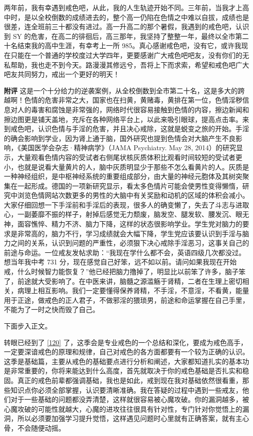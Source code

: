 \begin{case}
    两年前，我有幸遇到戒色吧，从此，我的人生轨迹开始不同。三年前，当我才上高中时，是以全校倒数的成绩进去的，整个高一仍陷在色情之中难以自拔，成绩也是很差，连全班前三十都没有进过。高一升高二的那个暑假，我遇到的戒色吧，认识到 SY 的危害，在高二的徘徊后，高三那年，我坚持了整整一年，最终以全市第二十名结束我的高中生涯，有幸考上一所 985。真心感谢戒色吧，没有它，或许我现在只能在一个普通的学校度过大学四年，更要感谢广大戒色吧吧友，没有你们的无私帮助，我也走不到今天。路漫漫其修远兮，吾将上下而求索，希望和戒色吧广大吧友共同努力，戒出一个更好的明天！

    \textbf{附评} 这是一个十分给力的逆袭案例，从全校倒数到全市第二十名，这是多大的跨越啊！色情的危害非常之大，国家也在扫黄，黄赌毒，黄排在第一位，色情淫秽信息对人的毒害和腐蚀是非常强的，网络时代很容易接触到色情的内容，擦边新闻和擦边图更是铺天盖地，充斥在各种网络平台上，以此来吸引眼球，提高点击率。来到戒色吧，认识色情与手淫的危害，并且决心戒除，这就是蜕变之旅的开始。手淫的确会影响到学业，因为肾上通于脑，国外研究也提到色情会对大脑产生不良影响，《美国医学会杂志·精神病学》（JAMA Psychiatry. May 28, 2014）的研究显示，大量观看色情内容的受试者右侧尾状核灰质体积比观看时间较短的受试者更小，也就是说看大量黄片的人，脑中灰质明显少于那些不怎么看黄片的人。灰质是一种神经组织，是中枢神经系统的重要组成部分，由大量的神经元胞体及其树突聚集在一起形成。德国的一项新研究显示，看太多色情片可能会使男性变得懒惰，研究中浏览色情网站次数更多的男性的大脑中有关奖励和动机的区域的体积会减小。大家仔细回想一下手淫前和手淫后的表现，很多人的确变懒了，失去了斗志与进取心，一副萎靡不振的样子，射掉后感觉无力颓废，脑发空、腿发软、腰发沉、眼无神，面容憔悴、精力不济、脑力下降，这样的状态很影响学业。学生党对脑力的要求是非常高的，脑力不行，学习成绩就会大幅下降，学生党应该要认识到手淫与脑力之间的关系，认识到问题的严重性，必须狠下决心戒除手淫恶习，这事关自己的前途与命运。一位戒友发帖求助：“我现在学什么都不会，英语四级几次都没过。想当年我中考 731 分，现在感觉自己好笨，远不如以前。请问如果我现在开始戒，什么时候智力能恢复？”他已经把脑力撸掉了，明显比以前笨了许多，脑子笨了，前途就大受影响了。在中医来讲，脑髓之源滥觞于肾精，二者在生理上密切相关，病理上相互影响。我们一定要懂得保养肾精，不手淫，不意淫，不看黄，能量用于正途，做戒色的正人君子，不做邪淫的猥琐男，前途和命运掌握在自己手里，不能为了一时之快而毁了自己。
\end{case}

下面步入正文。

转眼已经到了 \ref{120} 了，这季会是专业戒色的一个总结和深化，要成为戒色高手，一定要深谙戒色的原理和规律，自己对戒色的各方面都要有一个较为正确的认识。这季是基础篇，主要从戒色的基础要点进行分析和阐述，大家都知道扎实的基本功是非常重要的，你将来能达到什么高度，首先就取决于你的戒色基础是否扎实和稳固。真正的戒色前辈都强调基础，我也是如此，戒到现在我对基础依然很看重，那些知识点你必须全部掌握，认识要清晰准确。我在答疑的过程中遇到一些戒友，他们对于一些基础的问题都没弄清楚，这样就很容易被心魔攻破。你的漏洞越多，被心魔攻破的可能性就越大，心魔的进攻往往很具有针对性，专门针对你觉悟上的漏洞，所以必须要加强学习提升觉悟，这样遇见问题时心里就有正确答案，就有主心骨，不会随便动摇。

